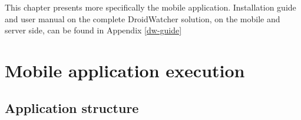 This chapter presents more specifically the mobile application.
Installation guide and user manual on the complete DroidWatcher solution, on the mobile and server side, can be found in Appendix \ref{dw-guide}




\section{Mobile application execution}

\subsection{Application structure}
\label{sec:dw-app-structure}

